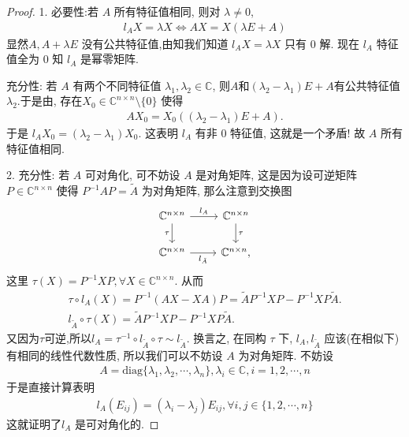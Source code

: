 \documentclass[../../main.tex]{subfiles}
\begin{document}
\begin{proof}
1. {\heiti 必要性:}若 $A$ 所有特征值相同, 则对 $\lambda \neq 0$,
\begin{align*}
l_A X = \lambda X \Leftrightarrow AX = X(\lambda E + A)
\end{align*}
显然$A, A + \lambda E$ 没有公共特征值,由知我们知道 $l_A X = \lambda X$ 只有 $0$ 解. 现在 $l_A$ 特征值全为 $0$ 知 $l_A$ 是幂零矩阵.

{\heiti 充分性:} 若 $A$ 有两个不同特征值 $\lambda_1, \lambda_2 \in \mathbb{C}$, 则$A$和$(\lambda_2-\lambda_1)E+A$有公共特征值$\lambda_2$.于是由, 存在$X_0 \in \mathbb{C}^{n \times n} \setminus \{0\}$ 使得
\begin{align*}
A X_0 = X_0((\lambda_2 - \lambda_1)E + A).
\end{align*}
于是 $l_A X_0 = (\lambda_2 - \lambda_1) X_0$. 这表明 $l_A$ 有非 $0$ 特征值, 这就是一个矛盾! 故 $A$ 所有特征值相同.

2. {\heiti 充分性:} 若 $A$ 可对角化, 可不妨设 $A$ 是对角矩阵, 这是因为设可逆矩阵 $P \in \mathbb{C}^{n \times n}$ 使得 $P^{-1} A P = \tilde{A}$ 为对角矩阵, 那么注意到交换图
\[
\begin{tikzcd}
\mathbb{C}^{n\times n} \arrow[d, "\tau"'] \arrow[r, "l_A"] & \mathbb{C}^{n\times n} \arrow[d, "\tau"] \\
\mathbb{C}^{n\times n} \arrow[r, "l_{\tilde{A}}"']                   & \mathbb{C}^{n\times n},                  
\end{tikzcd}
\]
这里 $\tau(X) = P^{-1} X P, \forall X \in \mathbb{C}^{n \times n}$. 从而
\begin{gather*}
\tau \circ l_A\left( X \right) =P^{-1}\left( AX-XA \right) P=\widetilde{A}P^{-1}XP-P^{-1}XP\widetilde{A}.
\\
l_{\widetilde{A}}\circ \tau \left( X \right) =\widetilde{A}P^{-1}XP-P^{-1}XP\widetilde{A}.
\end{gather*}
又因为$\tau$可逆,所以$l_A=\tau ^{-1} \circ l_{\tilde{A}}\circ \tau \sim l_{\tilde{A}}.$
换言之, 在同构 $\tau$ 下, $l_A, l_{\tilde{A}}$ 应该(在相似下)有相同的线性代数性质, 所以我们可以不妨设 $A$ 为对角矩阵.
不妨设
\begin{align*}
A = \mathrm{diag}\{\lambda_1, \lambda_2, \cdots, \lambda_n\}, \lambda_i \in \mathbb{C}, i = 1, 2, \cdots, n 
\end{align*}
于是直接计算表明
\begin{align*}
l_A(E_{ij}) = (\lambda_i - \lambda_j) E_{ij}, \forall i, j \in \{1, 2, \cdots, n\}
\end{align*}
这就证明了$l_A$ 是可对角化的.


\end{proof}
\end{document}
